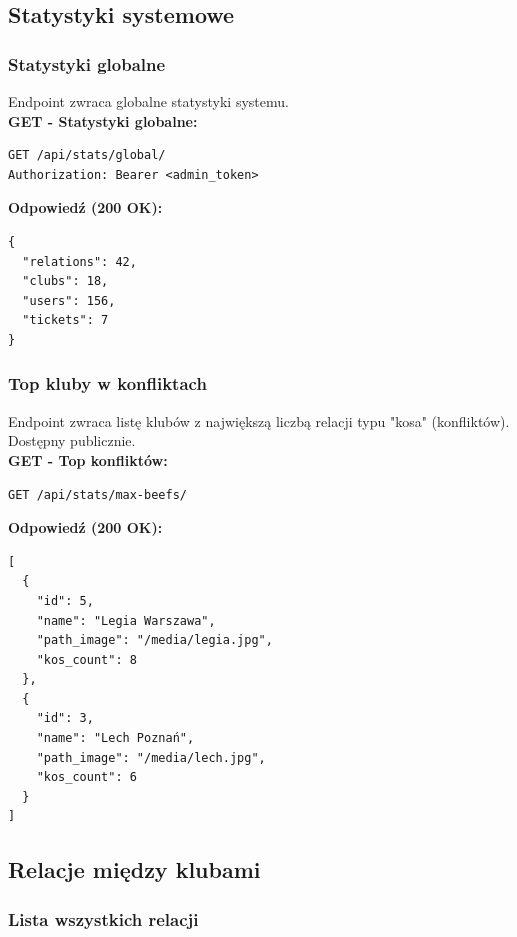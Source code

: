 \documentclass[a4paper,12pt]{article}
\begin{document}
\subsection{Statystyki systemowe}

\subsubsection{Statystyki globalne}

Endpoint zwraca globalne statystyki systemu. \\

\textbf{GET - Statystyki globalne:}
\begin{lstlisting}
GET /api/stats/global/
Authorization: Bearer <admin_token>
\end{lstlisting}

\vspace{0.5cm}

\textbf{Odpowiedź (200 OK):}
\begin{lstlisting}
{
  "relations": 42,
  "clubs": 18,
  "users": 156,
  "tickets": 7
}
\end{lstlisting}

\newpage

\subsubsection{Top kluby w konfliktach}

Endpoint zwraca listę klubów z największą liczbą relacji typu "kosa" (konfliktów). Dostępny publicznie. \\

\textbf{GET - Top konfliktów:}
\begin{lstlisting}
GET /api/stats/max-beefs/
\end{lstlisting}

\textbf{Odpowiedź (200 OK):}
\begin{lstlisting}
[
  {
    "id": 5,
    "name": "Legia Warszawa",
    "path_image": "/media/legia.jpg",
    "kos_count": 8
  },
  {
    "id": 3,
    "name": "Lech Poznań",
    "path_image": "/media/lech.jpg",
    "kos_count": 6
  }
]
\end{lstlisting}

\newpage

\subsection{Relacje między klubami}

\subsubsection{Lista wszystkich relacji}
\end{document}
